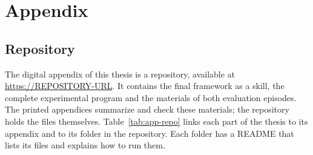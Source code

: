 \clearpage
\section{Appendix}
\label{app:A}

\subsection{Repository}
\label{app:repository}

The digital appendix of this thesis is a repository, available at \url{https://REPOSITORY-URL}. %
It contains the final framework as a skill, the complete experimental program and the materials of both evaluation episodes. The printed appendices summarize and check these materials; the repository holds the files themselves. Table~\ref{tab:app-repo} links each part of the thesis to its appendix and to its folder in the repository. Each folder has a README that lists its files and explains how to run them.

